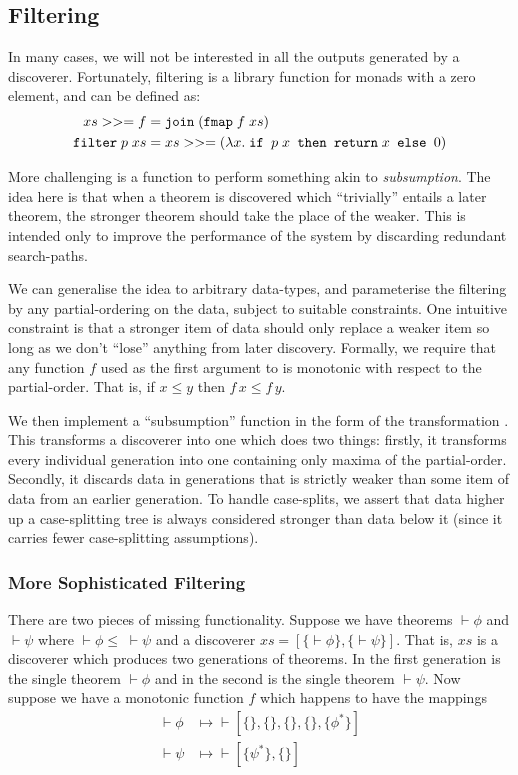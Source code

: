 \subsection{Filtering}\label{sec:Filtering}
In many cases, we will not be interested in all the outputs generated by a discoverer. Fortunately, filtering is a library function for monads with a zero element, and can be defined as:
\begin{align*}
xs >>= f &= \texttt{join}\;(\texttt{fmap}\;f\;xs) \\
\texttt{filter}\;p\;xs &= xs >>= (\lambda x.\;\texttt{if } p\;x \texttt{ then } \texttt{return}\;x \texttt { else } 0)
\end{align*}

More challenging is a function to perform something akin to \emph{subsumption}. The idea here is that when a theorem is discovered which ``trivially'' entails a later theorem, the stronger theorem should take the place of the weaker. This is intended only to improve the performance of the system by discarding redundant search-paths. 

We can generalise the idea to arbitrary data-types, and parameterise the filtering by any partial-ordering on the data, subject to suitable constraints. One intuitive constraint is that a stronger item of data should only replace a weaker item so long as we don't ``lose'' anything from later discovery. Formally, we require that any function $f$ used as the first argument to  is monotonic with respect to the partial-order. That is, if $x \leq y$ then $f\,x \leq f\,y$. 

We then implement a ``subsumption'' function in the form of the transformation . This transforms a discoverer into one which does two things: firstly, it transforms every individual generation into one containing only maxima of the partial-order. Secondly, it discards data in generations that is strictly weaker than some item of data from an earlier generation. To handle case-splits, we assert that data higher up a case-splitting tree is always considered stronger than data below it (since it carries fewer case-splitting assumptions).

\subsubsection{More Sophisticated Filtering}
There are two pieces of missing functionality. Suppose we have theorems $\vdash \phi$ and $\vdash \psi$ where $\vdash \phi \leq \;\vdash \psi$ and a discoverer $xs = \left[\{\vdash \phi\}, \{\vdash \psi\}\right].$ That is, $xs$ is a discoverer which produces two generations of theorems. In the first generation is the single theorem $\vdash \phi$ and in the second is the single theorem $\vdash \psi$. Now suppose we have a monotonic function $f$ which happens to have the mappings
\begin{align*}
\vdash\phi &\mapsto \vdash \left[\{\},\{\},\{\},\{\},\{\phi^{*}\}\right]\\
\vdash\psi &\mapsto \vdash \left[\{\psi^{*}\},\{\}\right]
\end{align*}

